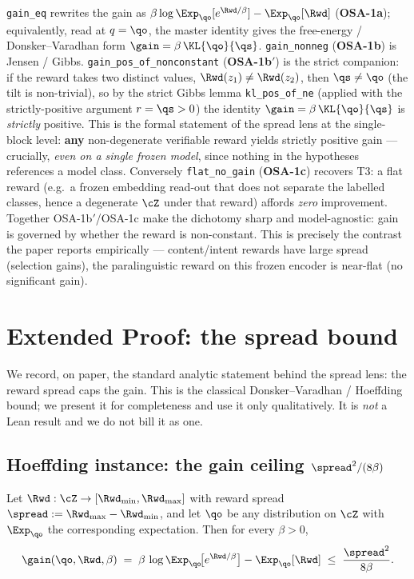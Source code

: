 \noindent
\texttt{gain\_eq} rewrites the gain as $\beta\log\Exp_{\qo}[e^{\Rwd/\beta}]-\Exp_{\qo}[\Rwd]$
(\textbf{OSA-1a}); equivalently, read at $q=\qo$, the master identity gives the free-energy /
Donsker--Varadhan form $\gain=\beta\,\KL{\qo}{\qs}$. \texttt{gain\_nonneg} (\textbf{OSA-1b}) is
Jensen / Gibbs. \texttt{gain\_pos\_of\_nonconstant} (\textbf{OSA-1b}$'$) is the strict companion: if the
reward takes two distinct values, $\Rwd(z_1)\ne\Rwd(z_2)$, then $\qs\ne\qo$ (the tilt is non-trivial),
so by the strict Gibbs lemma \texttt{kl\_pos\_of\_ne} (applied with the strictly-positive argument
$r=\qs>0$) the identity $\gain=\beta\,\KL{\qo}{\qs}$ is \emph{strictly} positive. This is the formal
statement of the spread lens at the single-block level: \textbf{any} non-degenerate verifiable reward
yields strictly positive gain --- crucially, \emph{even on a single frozen model}, since nothing in
the hypotheses references a model class. Conversely \texttt{flat\_no\_gain} (\textbf{OSA-1c}) recovers
T3: a flat reward (e.g.\ a frozen embedding read-out that does not separate the labelled classes,
hence a degenerate $\cZ$ under that reward) affords \emph{zero} improvement. Together OSA-1b$'$/OSA-1c
make the dichotomy sharp and model-agnostic: gain is governed by whether the reward is non-constant.
This is precisely the contrast the paper reports empirically --- content/intent rewards have large
spread (selection gains), the paralinguistic reward on this frozen encoder is near-flat (no
significant gain).

\section{Extended Proof: the spread bound}
\label{app:extended}

We record, on paper, the standard analytic statement behind the spread lens: the reward spread caps
the gain. This is the classical Donsker--Varadhan / Hoeffding bound; we present it for completeness
and use it only qualitatively. It is \emph{not} a Lean result and we do not bill it as one.

\subsection{Hoeffding instance: the gain ceiling \texorpdfstring{$\spread^2/(8\beta)$}{spread2/8beta}}
\label{app:hoeffding}

\begin{lemma}
\label{lem:hoeffding}
Let $\Rwd:\cZ\to[\Rwd_{\min},\Rwd_{\max}]$ with reward spread $\spread:=\Rwd_{\max}-\Rwd_{\min}$, and
let $\qo$ be any distribution on $\cZ$ with $\Exp_{\qo}$ the corresponding expectation. Then for every
$\beta>0$,
\[
\gain(\qo,\Rwd,\beta)\;=\;\beta\,\log\Exp_{\qo}\!\big[e^{\Rwd/\beta}\big]-\Exp_{\qo}[\Rwd]\;\le\;\frac{\spread^2}{8\beta}.
\]
\end{lemma}

